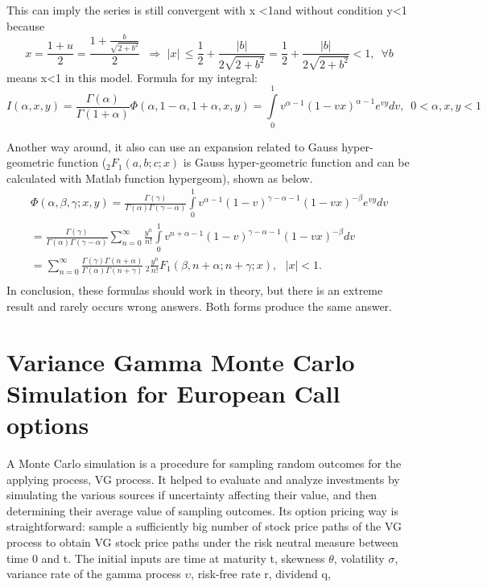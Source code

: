 This can imply the series is still convergent with \textbar x\textbar 
\textless 1and without condition \textbar y\textbar \textless 1 because 
\[
x=\frac{1+u}{2}=\frac{1+\frac{b}{\sqrt {2+b^{2}} }}{2}\,\,\,\Rightarrow 
\,\,\vert x\vert \,\le \frac{1}{2}+\frac{\vert b\vert }{2\sqrt {2+b^{2}} 
}=\frac{1}{2}+\frac{\vert b\vert }{2\sqrt {2+b^{2}} }<1,\,\,\,\forall b
\]
means \textbar x\textbar \textless 1 in this model. Formula for my integral:
\[
I(\alpha ,x,y)=\frac{\Gamma (\alpha )}{\Gamma (1+\alpha )}\Phi (\alpha 
,1-\alpha ,1+\alpha ,x,y)=\int\limits_0^1 {v^{\alpha -1}(1-vx)^{\alpha 
-1}e^{vy}dv,\,\,\,0<\alpha ,x,y<1} 
\]

Another way around, it also can use an expansion related to Gauss 
hyper-geometric function ($_{2} F_{1} (a,b;c;x)$ is Gauss hyper-geometric 
function and can be calculated with Matlab function hypergeom), shown as 
below. 
\[
\begin{array}{l}
 \Phi (\alpha ,\beta ,\gamma ;x,y)=\frac{\Gamma (\gamma )}{\Gamma (\alpha 
)\Gamma (\gamma -\alpha )}\int\limits_0^1 {v^{\alpha -1}(1-v)^{\gamma 
-\alpha -1}(1-vx)^{-\beta }e^{vy}dv} \\ 
 =\frac{\Gamma (\gamma )}{\Gamma (\alpha )\Gamma (\gamma -\alpha 
)}\sum\limits_{n=0}^\infty {\frac{y^{n}}{n!}\int\limits_0^1 {v^{n+\alpha 
-1}(1-v)^{\gamma -\alpha -1}(1-vx)^{-\beta }dv} } \\ 
 =\sum\limits_{n=0}^\infty {\frac{\Gamma (\gamma )\Gamma (n+\alpha )}{\Gamma 
(\alpha )\Gamma (n+\gamma )}} \,_{2} \frac{y^{n}}{n!}F_{1} (\beta ,n+\alpha 
;n+\gamma ;x),\,\,\,\,\vert x\vert <1. \\ 
 \end{array}
\]
In conclusion, these formulas should work in theory, but there is an extreme 
result and rarely occurs wrong answers. Both forms produce the same answer.

\section{Variance Gamma Monte Carlo Simulation for European 
Call options}

A Monte Carlo simulation is a procedure for sampling random outcomes for the 
applying process, VG process. It helped to evaluate and analyze investments 
by simulating the various sources if uncertainty affecting their value, and 
then determining their average value of sampling outcomes. Its option 
pricing way is straightforward: sample a sufficiently big number of stock 
price paths of the VG process to obtain VG stock price paths under the risk 
neutral measure between time 0 and t. The initial inputs are time at 
maturity t, skewness $\theta $, volatility $\sigma $, variance rate of the 
gamma process $\upsilon $, risk-free rate r, dividend q, 

